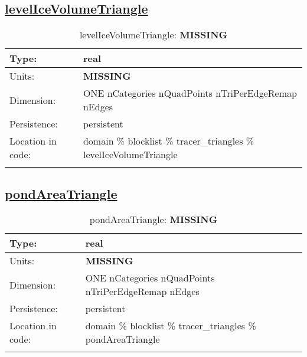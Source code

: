 \subsection[levelIceVolumeTriangle]{\hyperref[sec:var_tab_tracer_triangles]{levelIceVolumeTriangle}}
\label{subsec:var_sec_tracer_triangles_levelIceVolumeTriangle}
\begin{center}
\begin{longtable}{| p{2.0in} | p{4.0in} |}
        \hline 
        Type: & real \\
        \hline 
        Units: & {\bf \color{red} MISSING} \\
        \hline 
        Dimension: & ONE nCategories nQuadPoints nTriPerEdgeRemap nEdges \\
        \hline 
        Persistence: & persistent \\
        \hline 
         Location in code: & domain \% blocklist \% tracer\_triangles \% levelIceVolumeTriangle \\
         \hline 
    \caption{levelIceVolumeTriangle: {\bf \color{red} MISSING}}
\end{longtable}
\end{center}
\subsection[pondAreaTriangle]{\hyperref[sec:var_tab_tracer_triangles]{pondAreaTriangle}}
\label{subsec:var_sec_tracer_triangles_pondAreaTriangle}
\begin{center}
\begin{longtable}{| p{2.0in} | p{4.0in} |}
        \hline 
        Type: & real \\
        \hline 
        Units: & {\bf \color{red} MISSING} \\
        \hline 
        Dimension: & ONE nCategories nQuadPoints nTriPerEdgeRemap nEdges \\
        \hline 
        Persistence: & persistent \\
        \hline 
         Location in code: & domain \% blocklist \% tracer\_triangles \% pondAreaTriangle \\
         \hline 
    \caption{pondAreaTriangle: {\bf \color{red} MISSING}}
\end{longtable}
\end{center}
